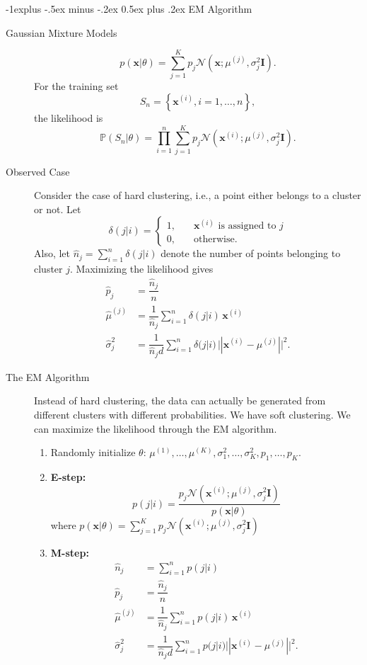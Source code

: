 \documentclass[a4paper, 10pt,landscape]{article}
\makeatletter
\renewcommand{\subsection}{\@startsection{subsection}{2}{0mm}%
                                {-1explus -.5ex minus -.2ex}%
                                {0.5ex plus .2ex}%
                                {\normalfont\normalsize\bfseries}}
\makeatother
\begin{document}
\begin{multicols*}{3}
\subsection{EM Algorithm}
\begin{description}
	\item[Gaussian Mixture Models] 
	$$p(\mathbf{x}|\theta)=\sum_{j=1}^{K}p_j\mathcal{N}\left(\mathbf{x};\mu^{(j)},\sigma_j^2\mathbf{I}\right).$$
	For the training set
	$$S_n=\left\{\mathbf{x}^{(i)}, i=1,\dots,n\right\},$$
	the likelihood is
	$$\mathbb{P}\left(S_n|\theta\right)=\prod_{i=1}^{n}\sum_{j=1}^{K}p_j\mathcal{N}\left(\mathbf{x}^{(i)};\mu^{(j)},\sigma_j^2\mathbf{I}\right).$$
	\item[Observed Case] Consider the case of hard clustering, i.e., a point either belongs to a cluster or not. Let
	$$\delta(j|i)=
	\begin{cases}
		1,\quad&\mathbf{x}^{(i)}\text{ is assigned to }j\\
		0,&\text{otherwise}.
	\end{cases}$$
	Also, let $\widehat{n}_j=\sum\limits_{i=1}^{n}\delta(j|i)$ denote the number of points belonging to cluster $j$. Maximizing the likelihood gives
	\begin{align*}
		\widehat{p}_j&=\dfrac{\widehat{n}_j}{n}\\
		\widehat{\mu}^{(j)}&=\dfrac{1}{\widehat{n}_j}\sum_{i=1}^{n}\delta(j|i)\,\mathbf{x}^{(i)}\\
		\widehat{\sigma}^2_j&=\dfrac{1}{\widehat{n}_jd}\sum_{i=1}^{n}\delta(j|i)\,||\mathbf{x}^{(i)}-\mu^{(j)}||^2.
	\end{align*}
	\item[The EM Algorithm] Instead of hard clustering, the data can actually be generated from different clusters with different probabilities. We have soft clustering. We can maximize the likelihood through the EM algorithm.
	\begin{enumerate}
		\item[] Randomly initialize $\theta$: $\mu^{(1)},\dots,\mu^{(K)},\sigma^2_1,\dots,\sigma^2_K,p_1,\dots,p_K.$
		\item {\bf E-step:}
		$$p(j|i)=\dfrac{p_j\mathcal{N}\left(\mathbf{x}^{(i)};\mu^{(j)},\sigma^2_j\mathbf{I}\right)}{p\left(\mathbf{x}|\theta\right)}$$
		where $p(\mathbf{x}|\theta)=\sum\limits_{j=1}^{K}p_j\mathcal{N}\left(\mathbf{x}^{(i)};\mu^{(j)},\sigma^2_j\mathbf{I}\right)$
		\item {\bf M-step:}
		\begin{align*}
			\widehat{n}_j&=\sum_{i=1}^{n}p(j|i)\\
			\widehat{p}_j&=\dfrac{\widehat{n}_j}{n}\\
			\widehat{\mu}^{(j)}&=\dfrac{1}{\widehat{n}_j}\sum_{i=1}^{n}p(j|i)\,\mathbf{x}^{(i)}\\
			\widehat{\sigma}^2_j&=\dfrac{1}{\widehat{n}_jd}\sum_{i=1}^{n}p(j|i)||\mathbf{x}^{(i)}-\mu^{(j)}||^2.
		\end{align*}
	\end{enumerate}
\end{description}


\end{multicols*}
\end{document}

